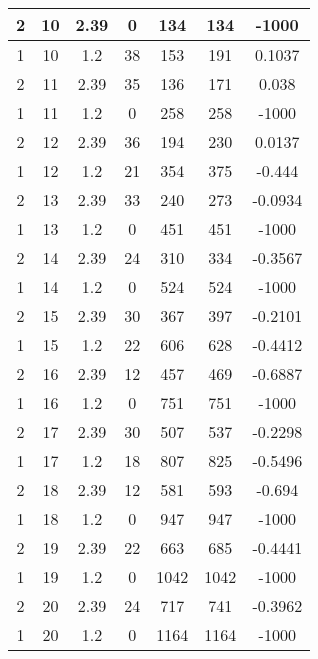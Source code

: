 \documentclass[letterpaper, 12pt]{article}
\begin{document}
\begin{longtable}{|c|c|c|c|c|c|c|}
\hline
2 & 10 & 2.39 & 0 & 134 & 134 & -1000 \\
\hline
1 & 10 & 1.2 & 38 & 153 & 191 & 0.1037 \\
\hline
2 & 11 & 2.39 & 35 & 136 & 171 & 0.038 \\
\hline
1 & 11 & 1.2 & 0 & 258 & 258 & -1000 \\
\hline
2 & 12 & 2.39 & 36 & 194 & 230 & 0.0137 \\
\hline
1 & 12 & 1.2 & 21 & 354 & 375 & -0.444 \\
\hline
2 & 13 & 2.39 & 33 & 240 & 273 & -0.0934 \\
\hline
1 & 13 & 1.2 & 0 & 451 & 451 & -1000 \\
\hline
2 & 14 & 2.39 & 24 & 310 & 334 & -0.3567 \\
\hline
1 & 14 & 1.2 & 0 & 524 & 524 & -1000 \\
\hline
2 & 15 & 2.39 & 30 & 367 & 397 & -0.2101 \\
\hline
1 & 15 & 1.2 & 22 & 606 & 628 & -0.4412 \\
\hline
2 & 16 & 2.39 & 12 & 457 & 469 & -0.6887 \\
\hline
1 & 16 & 1.2 & 0 & 751 & 751 & -1000 \\
\hline
2 & 17 & 2.39 & 30 & 507 & 537 & -0.2298 \\
\hline
1 & 17 & 1.2 & 18 & 807 & 825 & -0.5496 \\
\hline
2 & 18 & 2.39 & 12 & 581 & 593 & -0.694 \\
\hline
1 & 18 & 1.2 & 0 & 947 & 947 & -1000 \\
\hline
2 & 19 & 2.39 & 22 & 663 & 685 & -0.4441 \\
\hline
1 & 19 & 1.2 & 0 & 1042 & 1042 & -1000 \\
\hline
2 & 20 & 2.39 & 24 & 717 & 741 & -0.3962 \\
\hline
1 & 20 & 1.2 & 0 & 1164 & 1164 & -1000 \\
\hline
\end{longtable}
\end{document}
